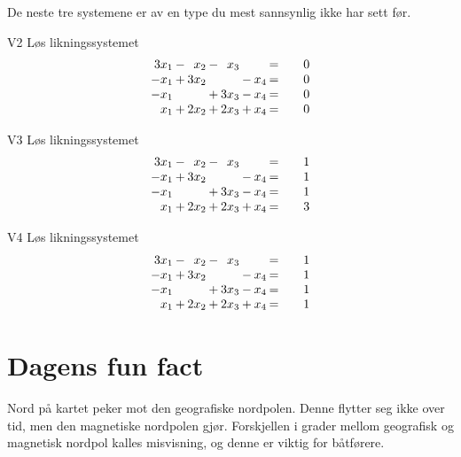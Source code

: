 De neste tre systemene er av en type du mest sannsynlig ikke har sett før.

\begin{oppgave}{V2}
Løs likningssystemet
\[
\setlength\arraycolsep{1pt}
\begin{array}{rcrcrcrc@{\qquad}l}
3x_1  &  - &   x_2    & - &   x_3   &  &      &   =   &  0  \\
-x_1 & + &   3x_2   &  &     & - &   x_4   &   =   &  0 \\
-x_1 &    &        & + &   3x_3  &  - &   x_4   &  =   &   0\\
 x_1  &  + &   2x_2   &  + &    2x_3   &  + &   x_4   &  =   &  0 
\end{array}
\]
\end{oppgave}

\begin{oppgave}{V3}
Løs likningssystemet
\[
\setlength\arraycolsep{1pt}
\begin{array}{rcrcrcrc@{\qquad}l}
3x_1  &  - &   x_2    & - &   x_3   &  &      &   =   &  1  \\
-x_1 & + &   3x_2   &  &     & - &   x_4   &   =   &  1 \\
-x_1 &    &        & + &   3x_3  &  - &   x_4   &  =   &   1\\
 x_1  &  + &   2x_2   &  + &    2x_3   &  + &   x_4   &  =   &  3 
\end{array}
\]
\end{oppgave}

\begin{oppgave}{V4}
Løs likningssystemet
\[
\setlength\arraycolsep{1pt}
\begin{array}{rcrcrcrc@{\qquad}l}
3x_1  &  - &   x_2    & - &   x_3   &  &      &   =   &  1  \\
-x_1 & + &   3x_2   &  &     & - &   x_4   &   =   &  1 \\
-x_1 &    &        & + &   3x_3  &  - &   x_4   &  =   &   1\\
 x_1  &  + &   2x_2   &  + &    2x_3   &  + &   x_4   &  =   &  1 
\end{array}
\]
\end{oppgave}

\section*{Dagens fun fact}
Nord på kartet peker mot den geografiske nordpolen. 
Denne flytter seg ikke over tid, 
men den magnetiske nordpolen gjør. 
Forskjellen i grader mellom geografisk og magnetisk nordpol kalles misvisning,
og denne er viktig for båtførere.

